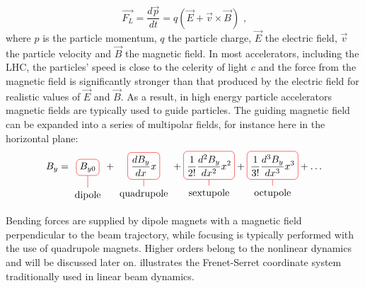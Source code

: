 \begin{equation}
    \vec{F_L} = \dfrac{d\vec{p}}{dt} = q (\vec{E} + \vec{v} \times \vec{B}) \text{ ,}
    \label{equation:lorentz_force}
\end{equation}
where \(p\) is the particle momentum, \(q\) the particle charge, \(\vec{E}\) the electric field, \(\vec{v}\) the particle velocity and \(\vec{B}\) the magnetic field.
In most accelerators, including the LHC, the particles' speed is close to the celerity of light \(c\) and the force from the magnetic field is significantly stronger than that produced by the electric field for realistic values of \(\vec{E}\) and \(\vec{B}\).
As a result, in high energy particle accelerators magnetic fields are typically used to guide particles.
The guiding magnetic field can be expanded into a series of multipolar fields, for instance here in the horizontal plane:
\begin{align}
    B_{y} = 
    \tikz[baseline]{
        \node[draw=red,rounded corners,anchor=base] (m1)
        {$\displaystyle B_{y0}$};
        \node[below of=m1] (l1) {dipole};
        \draw[-,red] (l1) -- (m1);
    }
    +
    \tikz[baseline]{
        \node[draw=red,rounded corners,anchor=base] (m2)
        {$\displaystyle \frac{dB_{y}}{dx} x$};
        \node[below of=m2] (l2) {quadrupole};
        \draw[-,red] (l2) -- (m2);
    }
    +
    \tikz[baseline]{
        \node[draw=red,rounded corners,anchor=base] (m3)
        {$\displaystyle \frac{1}{2!} \frac{d^2B_{y}}{dx^2} x^2$};
        \node[below of=m3] (l2) {sextupole};
        \draw[-,red] (l2) -- (m3);
    }
    +
    \tikz[baseline]{
        \node[draw=red,rounded corners,anchor=base] (m4)
        {$\displaystyle \frac{1}{3!} \frac{d^3B_{y}}{dx^3} x^3$};
        \node[below of=m4] (l2) {octupole};
        \draw[-,red] (l2) -- (m4);
    }
    + \ldots
    \label{equation:magnetic_field_expansion}
\end{align}

Bending forces are supplied by dipole magnets with a magnetic field perpendicular to the beam trajectory, while focusing is typically performed with the use of quadrupole magnets.
Higher orders belong to the nonlinear dynamics and will be discussed later on.
 illustrates the Frenet-Serret coordinate system traditionally used in linear beam dynamics.

